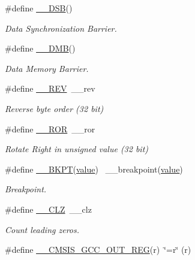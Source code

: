 \begin{DoxyCompactItemize}
\#define \hyperlink{group___c_m_s_i_s___core___instruction_interface_ga067d257a2b34565410acefb5afef2203}{\+\_\+\+\_\+\+D\+SB}()
\begin{DoxyCompactList}\small\item\em Data Synchronization Barrier. \end{DoxyCompactList}\item 
\#define \hyperlink{group___c_m_s_i_s___core___instruction_interface_ga671101179b5943990785f36f8c1e2269}{\+\_\+\+\_\+\+D\+MB}()
\begin{DoxyCompactList}\small\item\em Data Memory Barrier. \end{DoxyCompactList}\item 
\#define \hyperlink{group___c_m_s_i_s___core___instruction_interface_ga14f54807872c0f5e05604c4924abfdae}{\+\_\+\+\_\+\+R\+EV}~\+\_\+\+\_\+rev
\begin{DoxyCompactList}\small\item\em Reverse byte order (32 bit) \end{DoxyCompactList}\item 
\#define \hyperlink{group___c_m_s_i_s___core___instruction_interface_ga95b9bd281ddeda378b85afdb8f2ced86}{\+\_\+\+\_\+\+R\+OR}~\+\_\+\+\_\+ror
\begin{DoxyCompactList}\small\item\em Rotate Right in unsigned value (32 bit) \end{DoxyCompactList}\item 
\#define \hyperlink{group___c_m_s_i_s___core___instruction_interface_gaefbccd3648c75a5ce8362e4eae1671b9}{\+\_\+\+\_\+\+B\+K\+PT}(\hyperlink{semihosting_8h_aacce635d68067370c70caa2381ea1040}{value})                                          ~\+\_\+\+\_\+breakpoint(\hyperlink{semihosting_8h_aacce635d68067370c70caa2381ea1040}{value})
\begin{DoxyCompactList}\small\item\em Breakpoint. \end{DoxyCompactList}\item 
\#define \hyperlink{group___c_m_s_i_s___core___instruction_interface_ga5d5bb1527e042be4a9fa5a33f65cc248}{\+\_\+\+\_\+\+C\+LZ}~\+\_\+\+\_\+clz
\begin{DoxyCompactList}\small\item\em Count leading zeros. \end{DoxyCompactList}\item 
\#define \hyperlink{group___c_m_s_i_s___core___instruction_interface_gabc17e391c13c71702366c67cba39c276}{\+\_\+\+\_\+\+C\+M\+S\+I\+S\+\_\+\+G\+C\+C\+\_\+\+O\+U\+T\+\_\+\+R\+EG}(r)~\char`\"{}=r\char`\"{} (r)

\end{DoxyCompactItemize}
